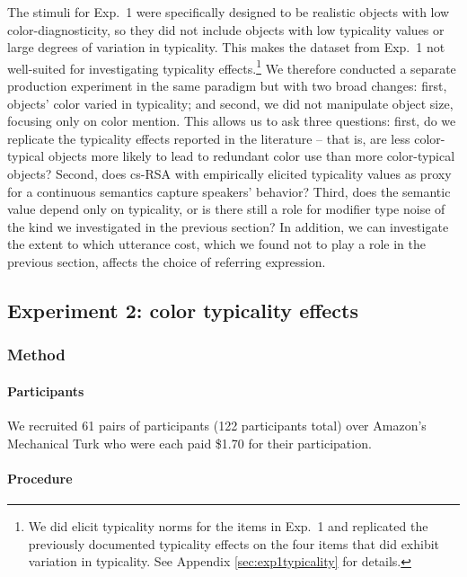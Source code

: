 \documentclass[11pt]{article}
\newcommand{\appref}[1]{Appendix \ref{#1}}
\begin{document}
The stimuli for Exp.~1 were specifically designed to be realistic objects with low color-diagnosticity, so they did not include objects with low typicality values or large degrees of variation in typicality. This makes the dataset from Exp.~1 not well-suited for investigating typicality effects.\footnote{We did elicit typicality norms for the items in Exp.~1 and replicated the previously documented typicality effects on the four items that did exhibit variation in typicality. See \appref{sec:exp1typicality} for details.} We therefore conducted a separate production experiment in the same paradigm but with two broad changes: first, objects' color varied in typicality; and second, we did not manipulate object size, focusing only on color mention. This allows us to ask three questions: first, do we replicate the typicality effects reported in the literature -- that is, are less color-typical objects more likely to lead to redundant color use than more color-typical objects? Second, does cs-RSA with empirically elicited typicality values as proxy for a continuous semantics capture speakers' behavior? Third, does the semantic value depend only on typicality, or is there still a role for modifier type noise of the kind we investigated in the previous section? In addition, we can investigate the extent to which utterance cost, which we found not to play a role in the previous section, affects the choice of referring expression.


\subsection{Experiment 2: color typicality effects}
\label{sec:modifiertypicalityeffects}



\subsubsection{Method}

\paragraph{Participants}
We recruited 61 pairs of participants (122 participants total) over Amazon's Mechanical Turk who were each paid \$1.70 for their participation. 


\paragraph{Procedure}
\end{document}
